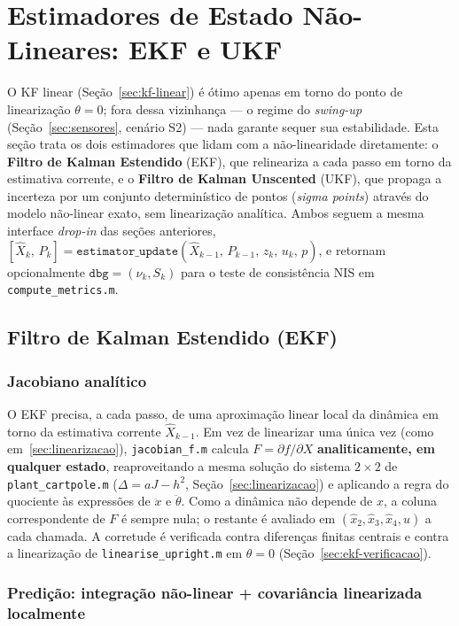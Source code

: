 \documentclass[brazil, 12pt]{article}
\begin{document}
\section{Estimadores de Estado Não-Lineares: EKF e UKF}
\label{sec:ekf-ukf}

O KF linear (Seção~\ref{sec:kf-linear}) é ótimo apenas em torno do ponto de
linearização $\theta=0$; fora dessa vizinhança — o regime do
\emph{swing-up} (Seção~\ref{sec:sensores}, cenário S2) — nada garante sequer
sua estabilidade. Esta seção trata os dois estimadores que lidam com a
não-linearidade diretamente: o \textbf{Filtro de Kalman Estendido} (EKF), que
relineariza a cada passo em torno da estimativa corrente, e o \textbf{Filtro
de Kalman Unscented} (UKF), que propaga a incerteza por um conjunto
determinístico de pontos (\emph{sigma points}) através do modelo não-linear
exato, sem linearização analítica. Ambos seguem a mesma interface
\emph{drop-in} das seções anteriores,
$[\hat X_k,\,P_k] = \texttt{estimator\_update}(\hat X_{k-1},\,P_{k-1},\,z_k,\,u_k,\,p)$,
e retornam opcionalmente $\texttt{dbg} = (\nu_k, S_k)$ para o teste de
consistência NIS em \texttt{compute\_metrics.m}.

\subsection{Filtro de Kalman Estendido (EKF)}
\label{sec:ekf}

\subsubsection{Jacobiano analítico}

O EKF precisa, a cada passo, de uma aproximação linear local da dinâmica em
torno da estimativa corrente $\hat X_{k-1}$. Em vez de linearizar uma única
vez (como em~\ref{sec:linearizacao}), \texttt{jacobian\_f.m} calcula
$F=\partial f/\partial X$ \textbf{analiticamente, em qualquer estado},
reaproveitando a mesma solução do sistema $2\times2$ de
\texttt{plant\_cartpole.m} ($\Delta=aJ-h^2$, Seção~\ref{sec:linearizacao}) e
aplicando a regra do quociente às expressões de $\ddot x$ e $\ddot\theta$.
Como a dinâmica não depende de $x$, a coluna correspondente de $F$ é sempre
nula; o restante é avaliado em $(\hat x_2,\hat x_3,\hat x_4,u)$ a cada
chamada. A corretude é verificada contra diferenças finitas centrais e contra
a linearização de \texttt{linearise\_upright.m} em $\theta=0$
(Seção~\ref{sec:ekf-verificacao}).

\subsubsection{Predição: integração não-linear + covariância linearizada localmente}
\end{document}
